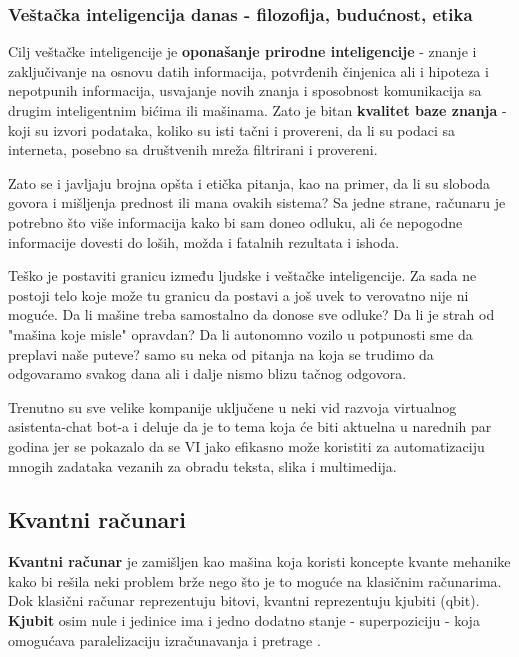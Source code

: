 \documentclass[a4paper]{article}
\begin{document}
{\subsubsection{Veštačka inteligencija danas - filozofija, budućnost, etika}
Cilj veštačke inteligencije je {\bf oponašanje prirodne inteligencije } - znanje i zaključivanje na osnovu datih informacija, potvrđenih činjenica ali i hipoteza  i nepotpunih informacija, usvajanje novih znanja i sposobnost komunikacija sa drugim inteligentnim bićima ili mašinama. Zato je bitan { \bf kvalitet baze znanja } - koji su izvori podataka, koliko su isti tačni i provereni, da li su podaci sa interneta, posebno sa društvenih mreža filtrirani i provereni.

Zato se i javljaju brojna opšta i etička pitanja, kao na primer, da li su sloboda govora i mišljenja prednost ili mana ovakih sistema? 
Sa jedne strane, računaru je potrebno što više informacija kako bi sam doneo odluku, ali će nepogodne informacije dovesti do loših, možda i fatalnih rezultata i ishoda. 

Teško je postaviti granicu između ljudske i veštačke inteligencije. Za sada ne postoji telo koje može tu granicu da postavi a još uvek to verovatno nije ni moguće. Da li mašine treba samostalno da donose sve odluke?  Da li je strah od "mašina koje misle" opravdan? Da li autonomno vozilo u potpunosti sme da preplavi naše puteve? samo su neka od pitanja na koja se trudimo da odgovaramo svakog dana ali i dalje nismo blizu tačnog odgovora.

Trenutno su sve velike kompanije uključene u neki vid razvoja virtualnog asistenta-chat bot-a i deluje da je to tema koja će biti aktuelna u narednih par godina jer se pokazalo da se VI jako efikasno može koristiti za automatizaciju mnogih zadataka vezanih za obradu teksta, slika i multimedija. 


\setlength{\parskip}{1em}


\subsection{Kvantni računari}	
{\bf Kvantni računar} je zamišljen kao mašina koja koristi koncepte kvante mehanike kako bi rešila neki problem brže nego što je to moguće na klasičnim računarima. Dok klasični računar reprezentuju bitovi, kvantni
reprezentuju kjubiti (qbit). {\bf Kjubit} osim nule i jedinice ima i jedno dodatno stanje - superpoziciju - koja omogućava paralelizaciju
izračunavanja i pretrage \cite{kvantni}.

}
\end{document}
